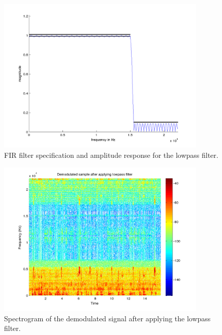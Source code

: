 \begin{figure}[]
  \begin{center}
    \hspace*{-1in}
    \includegraphics[width=100mm]{q1_fir_filter_specification}
    \caption{FIR filter specification and amplitude response for the
    lowpass filter. \label{fig:q1_fir_filter_specification}}
  \end{center}  
\end{figure}

\begin{figure}[]
  \begin{center}
    \hspace*{-1in}
    \includegraphics[width=100mm]{q1_demodulated_filtered_spectrogram}
    \caption{Spectrogram of the demodulated signal after applying the
    lowpass filter. 
      \label{fig:q1_demodulated_filtered_spectrogram}}
  \end{center}  
\end{figure}

\newpage
